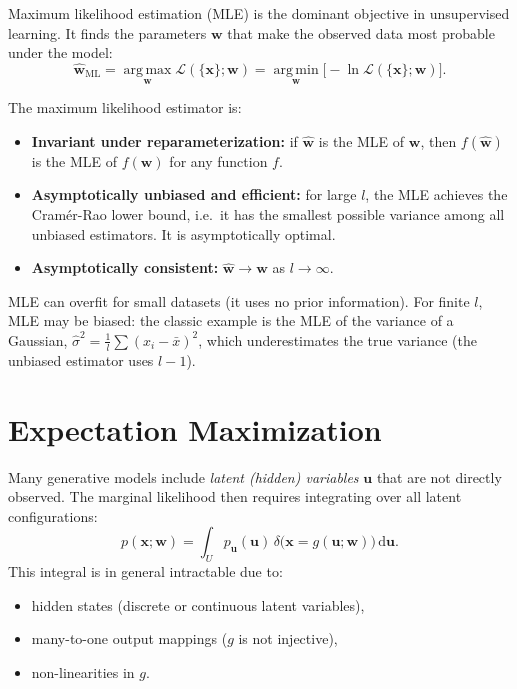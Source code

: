 \documentclass[11pt, oneside]{book}
\newcommand{\argmax}{\operatorname*{arg\,max}}
\newcommand{\argmin}{\operatorname*{arg\,min}}
\newcommand{\dd}{\,\mathrm{d}}
\newcommand{\wvec}{\bm{w}}
\newcommand{\what}{\hat{\bm{w}}}
\newcommand{\xvec}{\bm{x}}
\newcommand{\uvec}{\bm{u}}
\newcommand{\lhood}{\mathcal{L}}
\begin{document}
Maximum likelihood estimation (MLE) is the dominant objective in unsupervised learning.
It finds the parameters $\wvec$ that make the observed data most probable under the model:
\[
  \what_{\mathrm{ML}} = \argmax_{\wvec} \lhood(\{\xvec\};\wvec) = \argmin_{\wvec} \bigl[-\ln\lhood(\{\xvec\};\wvec)\bigr].
\]

\begin{thmbox}[title={Properties of the MLE}]
The maximum likelihood estimator is:
\begin{itemize}
  \item \textbf{Invariant under reparameterization:} if $\hat{\wvec}$ is the MLE of
        $\wvec$, then $f(\hat{\wvec})$ is the MLE of $f(\wvec)$ for any function $f$.
  \item \textbf{Asymptotically unbiased and efficient:} for large $l$, the MLE achieves
        the Cram\'{e}r-Rao lower bound, i.e.\ it has the smallest possible variance among
        all unbiased estimators. It is asymptotically optimal.
  \item \textbf{Asymptotically consistent:} $\what \to \wvec$ as $l \to \infty$.
\end{itemize}
\end{thmbox}

\begin{notebox}[title={MLE caveats}]
MLE can overfit for small datasets (it uses no prior information).
For finite $l$, MLE may be biased: the classic example is the MLE of the variance of a
Gaussian, $\hat{\sigma}^2 = \frac{1}{l}\sum(x_i - \bar{x})^2$, which underestimates
the true variance (the unbiased estimator uses $l-1$).
\end{notebox}


\section{Expectation Maximization}
\label{sec:em}

Many generative models include \emph{latent (hidden) variables} $\uvec$ that are not
directly observed.
The marginal likelihood then requires integrating over all latent configurations:
\[
  p(\xvec;\wvec) = \int_U p_{\uvec}(\uvec)\,\delta\!\bigl(\xvec = g(\uvec;\wvec)\bigr)\dd\uvec.
\]
This integral is in general intractable due to:
\begin{itemize}
  \item hidden states (discrete or continuous latent variables),
  \item many-to-one output mappings ($g$ is not injective),
  \item non-linearities in $g$.
\end{itemize}
\end{document}
